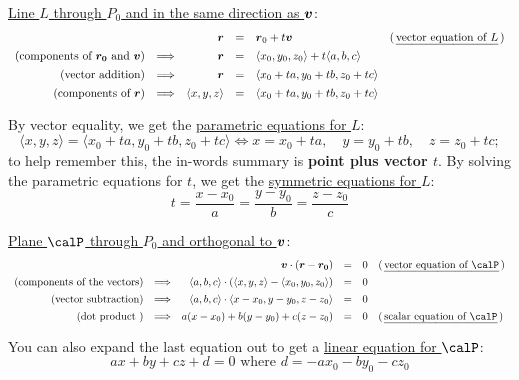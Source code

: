\documentclass[12pt]{article}
\newcommand{\subsectitle}[2]{\vspace{3mm}\noindent\ul{#1}:\\[3mm]\indent{#2}}
\newcommand{\compslong}[3]{\langle #1, #2, #3\rangle}
\begin{document}
	\subsectitle{Line $L$ through $P_0$ and in the same direction as $\boldsymbol{v}$}{\vspace{-9mm}}
	$$
		\begin{array}{rcrcll}
			& & \vect{r} & = & \vect{r}_0 + t\vect{v} & \text{(\,\ul{vector equation of $L$}\,)}\\[1.5mm]
			\text{(components of $\vect{r_0}$ and $\vect{v}$)} & \Longrightarrow & \vect{r} & = & \compslong{x_0}{y_0}{z_0} + t\compslong{a}{b}{c}\\[1.5mm]
			\text{(vector addition)} & \Longrightarrow & \vect{r} & = & \compslong{x_0+ta}{y_0+tb}{z_0+tc}\\[1.5mm]
			\text{(components of $\vect{r}$)} & \Longrightarrow & \compslong{x}{y}{z} & = & \compslong{x_0+ta}{y_0+tb}{z_0+tc}\\[1.5mm]
		\end{array}
	$$
	By vector equality, we get the \ul{parametric equations for $L$}:
	\begin{equation*}
		\compslong{x}{y}{z}=\compslong{x_0+ta}{y_0+tb}{z_0+tc}\Longleftrightarrow \boxed{x=x_0+ta,\quad y=y_0+tb,\quad z=z_0+tc};
	\end{equation*}
	to help remember this, the in-words summary is \textbf{point plus vector $t$}. By solving the parametric equations for $t$, we get the \ul{symmetric equations for $L$}:
	$$
		t=\boxed{\frac{x-x_0}{a}=\frac{y-y_0}{b}=\frac{z-z_0}{c}}
	$$
	
	\subsectitle{Plane $\calP$ through $P_0$ and orthogonal to $\boldsymbol{v}$}{\vspace{-9mm}}
	$$
		\begin{array}{rcrcll}
		& & \vect{v}\cdot\left(\vect{r}-\vect{r_0}\right) & = & 0 & \text{(\,\ul{vector equation of $\calP$}\,)}\\[1.5mm]
		\text{(components of the vectors)} & \Longrightarrow & \compslong{a}{b}{c}\cdot\left(\compslong{x}{y}{z}-\compslong{x_0}{y_0}{z_0}\right) & = & 0 & \\[1.5mm]
		\text{(vector subtraction)}& \Longrightarrow & \compslong{a}{b}{c}\cdot\compslong{x-x_0}{y-y_0}{z-z_0} & = & 0 & \\[1.5mm]
		\text{(dot product )}& \Longrightarrow & a(x-x_0)+b(y-y_0)+c(z-z_0) & = & 0 & \text{(\,\ul{scalar equation of $\calP$}\,)} \\[1.5mm]
		\end{array}
	$$
	You can also expand the last equation out to get a \ul{linear equation for $\calP$}:
	$$\boxed{ax+by+cz+d=0\text{ where }d=-ax_0-by_0-cz_0}$$
	
\end{document}
